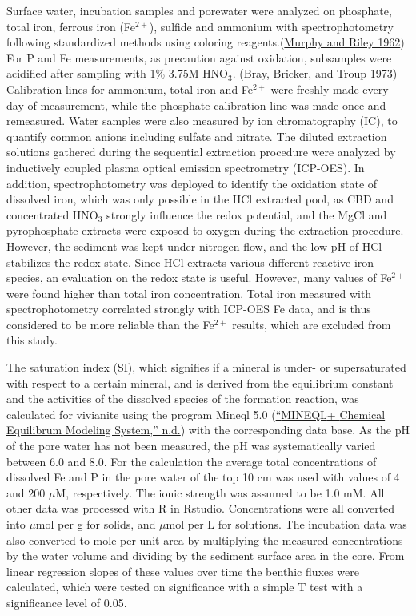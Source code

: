 \documentclass[a4paper,11pt]{article}
\begin{document}
Surface water, incubation samples and porewater were analyzed on phosphate, total iron, ferrous iron (Fe\(^{2+}\)), sulfide and ammonium with spectrophotometry following standardized methods using coloring reagents.(\protect\hyperlink{ref-murphyModifiedSingleSolution1962}{Murphy and Riley 1962}) For P and Fe measurements, as precaution against oxidation, subsamples were acidified after sampling with 1\% 3.75M HNO\(_3\). (\protect\hyperlink{ref-brayPhosphateInterstitialWaters1973}{Bray, Bricker, and Troup 1973}) Calibration lines for ammonium, total iron and Fe\(^{2+}\) were freshly made every day of measurement, while the phosphate calibration line was made once and remeasured. Water samples were also measured by ion chromatography (IC), to quantify common anions including sulfate and nitrate. The diluted extraction solutions gathered during the sequential extraction procedure were analyzed by inductively coupled plasma optical emission spectrometry (ICP-OES). In addition, spectrophotometry was deployed to identify the oxidation state of dissolved iron, which was only possible in the HCl extracted pool, as CBD and concentrated HNO\(_3\) strongly influence the redox potential, and the MgCl and pyrophosphate extracts were exposed to oxygen during the extraction procedure. However, the sediment was kept under nitrogen flow, and the low pH of HCl stabilizes the redox state. Since HCl extracts various different reactive iron species, an evaluation on the redox state is useful. However, many values of Fe\(^{2+}\) were found higher than total iron concentration. Total iron measured with spectrophotometry correlated strongly with ICP-OES Fe data, and is thus considered to be more reliable than the Fe\(^{2+}\) results, which are excluded from this study.

The saturation index (SI), which signifies if a mineral is under- or supersaturated with respect to a certain mineral, and is derived from the equilibrium constant and the activities of the dissolved species of the formation reaction, was calculated for vivianite using the program Mineql 5.0 (\protect\hyperlink{ref-MINEQLChemicalEquilibrum}{{``{MINEQL}+ {Chemical Equilibrum Modeling System},''} n.d.}) with the corresponding data base. As the pH of the pore water has not been measured, the pH was systematically varied between 6.0 and 8.0. For the calculation the average total concentrations of dissolved Fe and P in the pore water of the top 10 cm was used with values of 4 and 200 \(\mu\)M, respectively. The ionic strength was assumed to be 1.0 mM. All other data was processed with R in Rstudio. Concentrations were all converted into \(\mu\)mol per g for solids, and \(\mu\)mol per L for solutions. The incubation data was also converted to mole per unit area by multiplying the measured concentrations by the water volume and dividing by the sediment surface area in the core. From linear regression slopes of these values over time the benthic fluxes were calculated, which were tested on significance with a simple T test with a significance level of 0.05.
\end{document}
